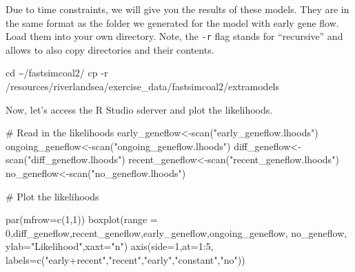 \documentclass[
  letterpaper,
  DIV=11,
  numbers=noendperiod]{scrartcl}
\newenvironment{Shaded}{\begin{snugshade}}{\end{snugshade}}
\newcommand{\AttributeTok}[1]{\textcolor[rgb]{0.40,0.45,0.13}{#1}}
\newcommand{\CommentTok}[1]{\textcolor[rgb]{0.37,0.37,0.37}{#1}}
\newcommand{\DecValTok}[1]{\textcolor[rgb]{0.68,0.00,0.00}{#1}}
\newcommand{\FunctionTok}[1]{\textcolor[rgb]{0.28,0.35,0.67}{#1}}
\newcommand{\NormalTok}[1]{\textcolor[rgb]{0.00,0.23,0.31}{#1}}
\newcommand{\OtherTok}[1]{\textcolor[rgb]{0.00,0.23,0.31}{#1}}
\newcommand{\SpecialCharTok}[1]{\textcolor[rgb]{0.37,0.37,0.37}{#1}}
\newcommand{\StringTok}[1]{\textcolor[rgb]{0.13,0.47,0.30}{#1}}
\begin{document}
Due to time constraints, we will give you the results of these models.
They are in the same format as the folder we generated for the model
with early gene flow. Load them into your own directory. Note, the
\texttt{-r} flag stands for ``recursive'' and allows to also copy
directories and their contents.

\begin{Shaded}
\begin{Highlighting}[]
\NormalTok{cd \textasciitilde{}/fastsimcoal2/}
\NormalTok{cp {-}r /resources/riverlandsea/exercise\_data/fastsimcoal2/extramodels}
\end{Highlighting}
\end{Shaded}

Now, let's access the R Studio sderver and plot the likelihoods.

\begin{Shaded}
\begin{Highlighting}[]


\CommentTok{\# Read in the likelihoods}
\NormalTok{early\_geneflow}\OtherTok{\textless{}{-}}\FunctionTok{scan}\NormalTok{(}\StringTok{"early\_geneflow.lhoods"}\NormalTok{)}
\NormalTok{ongoing\_geneflow}\OtherTok{\textless{}{-}}\FunctionTok{scan}\NormalTok{(}\StringTok{"ongoing\_geneflow.lhoods"}\NormalTok{)}
\NormalTok{diff\_geneflow}\OtherTok{\textless{}{-}}\FunctionTok{scan}\NormalTok{(}\StringTok{"diff\_geneflow.lhoods"}\NormalTok{)}
\NormalTok{recent\_geneflow}\OtherTok{\textless{}{-}}\FunctionTok{scan}\NormalTok{(}\StringTok{"recent\_geneflow.lhoods"}\NormalTok{)}
\NormalTok{no\_geneflow}\OtherTok{\textless{}{-}}\FunctionTok{scan}\NormalTok{(}\StringTok{"no\_geneflow.lhoods"}\NormalTok{)}

\CommentTok{\# Plot the likelihoods}

\FunctionTok{par}\NormalTok{(}\AttributeTok{mfrow=}\FunctionTok{c}\NormalTok{(}\DecValTok{1}\NormalTok{,}\DecValTok{1}\NormalTok{))}
\FunctionTok{boxplot}\NormalTok{(}\AttributeTok{range =} \DecValTok{0}\NormalTok{,diff\_geneflow,recent\_geneflow,early\_geneflow,ongoing\_geneflow,}
\NormalTok{        no\_geneflow, }\AttributeTok{ylab=}\StringTok{"Likelihood"}\NormalTok{,}\AttributeTok{xaxt=}\StringTok{"n"}\NormalTok{)}
\FunctionTok{axis}\NormalTok{(}\AttributeTok{side=}\DecValTok{1}\NormalTok{,}\AttributeTok{at=}\DecValTok{1}\SpecialCharTok{:}\DecValTok{5}\NormalTok{, }\AttributeTok{labels=}\FunctionTok{c}\NormalTok{(}\StringTok{"early+recent"}\NormalTok{,}\StringTok{"recent"}\NormalTok{,}\StringTok{"early"}\NormalTok{,}\StringTok{"constant"}\NormalTok{,}\StringTok{"no"}\NormalTok{))}
\end{Highlighting}
\end{Shaded}
\end{document}
